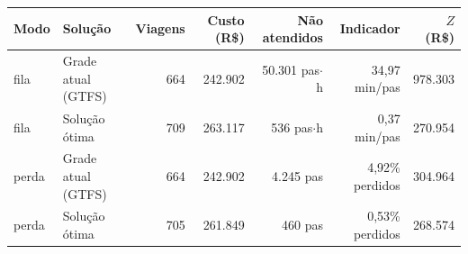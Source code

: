 \begin{tabular}{llrrrrr}
\toprule
Modo & Solução & Viagens & Custo (R\$) & Não atendidos & Indicador & $Z$ (R\$) \\
\midrule
fila & Grade atual (GTFS) & 664 & 242.902 & 50.301 pas$\cdot$h & 34{,}97 min/pas & 978.303 \\
fila & Solução ótima & 709 & 263.117 & 536 pas$\cdot$h & 0{,}37 min/pas & 270.954 \\
\midrule
perda & Grade atual (GTFS) & 664 & 242.902 & 4.245 pas & 4{,}92\% perdidos & 304.964 \\
perda & Solução ótima & 705 & 261.849 & 460 pas & 0{,}53\% perdidos & 268.574 \\
\bottomrule
\end{tabular}
